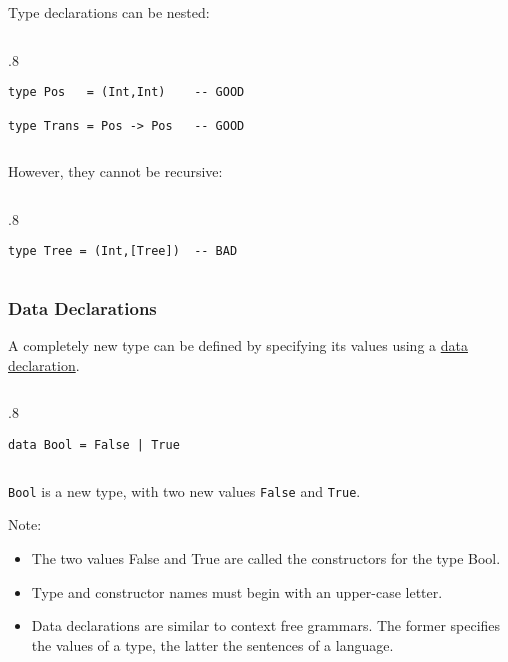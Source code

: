 \documentclass{beamer}
\newenvironment{codeblock}[1][.8]{%
\begin{columns}
\begin{column}{#1\linewidth}
\begin{exampleblock}{}}{%
\end{exampleblock}
\end{column}
\end{columns}}
\def\slideskip{\vskip 0.1in}
\begin{document}
\begin{frame}[fragile]
\Large

Type declarations can be nested:

\slideskip

\begin{codeblock}
\vspace{-2ex}
\begin{verbatim}
type Pos   = (Int,Int)    -- GOOD

type Trans = Pos -> Pos   -- GOOD
\end{verbatim}
\vspace{-2ex}
\end{codeblock}

\slideskip
However, they cannot be recursive:
\slideskip

\begin{codeblock}
\vspace{-2ex}
\begin{verbatim}
type Tree = (Int,[Tree])  -- BAD
\end{verbatim}
\vspace{-2ex}
\end{codeblock}

\end{frame}

\begin{frame}[fragile]
\LARGE

\frametitle{Data Declarations}

A completely new type can be defined by specifying 
its values using a \underline{data declaration}. 

\slideskip

\begin{codeblock}
\vspace{-2ex}
\begin{verbatim}
data Bool = False | True
\end{verbatim}
\vspace{-2ex}
\end{codeblock}

\slideskip
{\tt Bool} is a new type, with two 
new values {\tt False} and {\tt True}.

\end{frame}

\begin{frame}[fragile]
\LARGE

Note: 
\begin{itemize}
\item The two values False and True are called the 
constructors for the type Bool. 
\item Type and constructor names must begin with 
an upper-case letter. 
\item Data declarations are similar to context free 
grammars.  The former specifies the values of 
a type, the latter the sentences of a language.
\end{itemize}
\end{frame}
\end{document}
